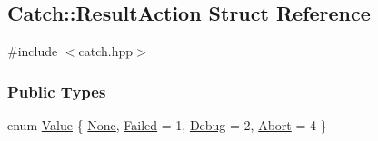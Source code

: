 \hypertarget{structCatch_1_1ResultAction}{\subsection{Catch\-:\-:Result\-Action Struct Reference}
\label{structCatch_1_1ResultAction}
}


{\ttfamily \#include $<$catch.\-hpp$>$}

\subsubsection*{Public Types}
\begin{DoxyCompactItemize}
\item 
enum \hyperlink{structCatch_1_1ResultAction_a42d1644a0fbcedc17959b656ce68f88d}{Value} \{ \hyperlink{structCatch_1_1ResultAction_a42d1644a0fbcedc17959b656ce68f88da07f288252272482cfe70fd7886b6b4e1}{None}, 
\hyperlink{structCatch_1_1ResultAction_a42d1644a0fbcedc17959b656ce68f88da3602c06b3b764ad76961306aa5741d61}{Failed} = 1, 
\hyperlink{structCatch_1_1ResultAction_a42d1644a0fbcedc17959b656ce68f88da84712ac305febc996dafcf6635cf08da}{Debug} = 2, 
\hyperlink{structCatch_1_1ResultAction_a42d1644a0fbcedc17959b656ce68f88daf5b1d85e6651aa7f29481d63558c4795}{Abort} = 4
 \}
\end{DoxyCompactItemize}


